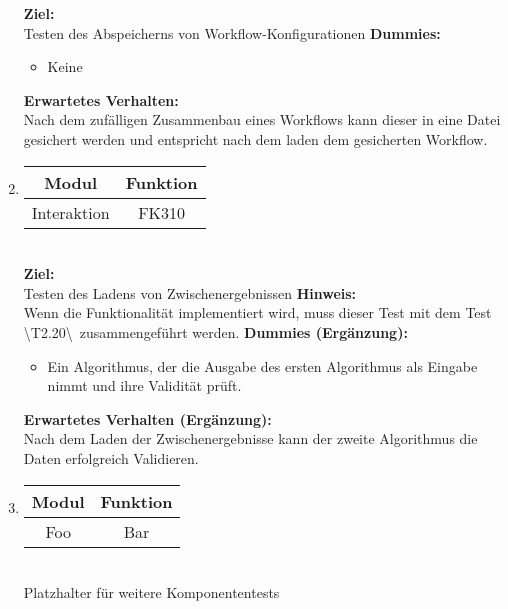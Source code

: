 \begin{enumerate}[align=left, leftmargin=4em, label={\textbf{\textbackslash T2.\arabic*0\textbackslash}} ]
		\subitem \textbf{Ziel:}\\ Testen des Abspeicherns von Workflow-Konfigurationen
		\subitem \textbf{Dummies:} \begin{itemize}
			\item Keine
		\end{itemize}
		\subitem \textbf{Erwartetes Verhalten:}\\ Nach dem zufälligen Zusammenbau eines Workflows kann dieser in eine Datei gesichert werden und entspricht nach dem laden dem gesicherten Workflow.
		\item \begin{tabular}{|c|c|}
			\hline Modul & Funktion \\
			\hline Interaktion & FK310 \\
			\hline
		\end{tabular}\\
		\subitem \textbf{Ziel:}\\ Testen des Ladens von Zwischenergebnissen
		\subitem \textbf{Hinweis:}\\ Wenn die Funktionalität implementiert wird, muss dieser Test mit dem Test \textbackslash T2.20\textbackslash zusammengeführt werden.
		\subitem \textbf{Dummies (Ergänzung):}\begin{itemize}
			\item Ein Algorithmus, der die Ausgabe des ersten Algorithmus als Eingabe nimmt und ihre Validität prüft.
		\end{itemize}
		\subitem \textbf{Erwartetes Verhalten (Ergänzung):}\\ Nach dem Laden der Zwischenergebnisse kann der zweite Algorithmus die Daten erfolgreich Validieren.
		\item \begin{tabular}{|c|c|}
			\hline Modul & Funktion \\
			\hline Foo & Bar \\
			\hline
		\end{tabular}\\
		\subitem Platzhalter für weitere Komponententests
	\end{enumerate}
